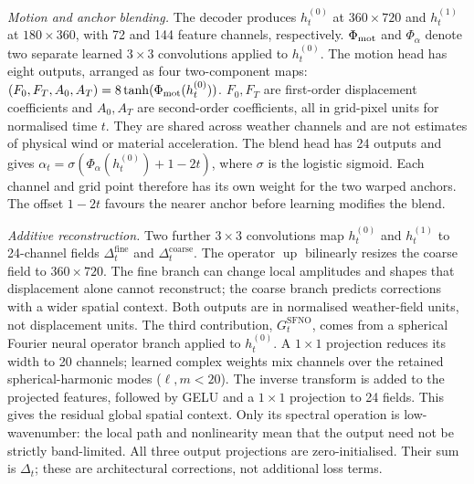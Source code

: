 \documentclass[referee,lineno,pdflatex,sn-nature]{sn-jnl}
\begin{document}
\begin{deferredmethodsintro}
\emph{Motion and anchor blending.}
The decoder produces $h_t^{(0)}$ at $360\times720$ and $h_t^{(1)}$ at
$180\times360$, with 72 and 144 feature channels, respectively.
$\Phi_{\rm mot}$ and $\Phi_\alpha$ denote two separate learned
$3\times3$ convolutions applied to $h_t^{(0)}$.
The motion head has eight outputs, arranged as four two-component maps:
$(F_0,F_T,A_0,A_T)=8\tanh(\Phi_{\rm mot}(h_t^{(0)}))$.
$F_0,F_T$ are first-order displacement coefficients and $A_0,A_T$
are second-order coefficients, all in grid-pixel units for normalised
time $t$. They are shared across weather channels and are not estimates
of physical wind or material acceleration.
The blend head has 24 outputs and gives
$\alpha_t=\sigma(\Phi_\alpha(h_t^{(0)})+1-2t)$, where $\sigma$ is the
logistic sigmoid. Each channel and grid point therefore has its own weight
for the two warped anchors. The offset $1-2t$ favours the nearer anchor
before learning modifies the blend.

\emph{Additive reconstruction.}
Two further $3\times3$ convolutions map $h_t^{(0)}$ and $h_t^{(1)}$ to
24-channel fields $\Delta_t^{\mathrm{fine}}$ and
$\Delta_t^{\mathrm{coarse}}$. The operator $\operatorname{up}$ bilinearly
resizes the coarse field to $360\times720$. The fine branch can change
local amplitudes and shapes that displacement alone cannot reconstruct;
the coarse branch predicts corrections with a wider spatial context.
Both outputs are in normalised weather-field units, not displacement units.
The third contribution, $G_t^{\mathrm{SFNO}}$, comes from a spherical
Fourier neural operator branch \cite{bonev2023sfno} applied to $h_t^{(0)}$.
A $1\times1$ projection reduces its width to 20 channels; learned complex
weights mix channels over the retained spherical-harmonic modes
($\ell,m<20$). The inverse transform is added to the projected features,
followed by GELU and a $1\times1$ projection to 24 fields. This gives
the residual global spatial context. Only its spectral operation is
low-wavenumber: the local path and nonlinearity mean that the output
need not be strictly band-limited. All three output projections are
zero-initialised. Their sum is $\Delta_t$; these are architectural
corrections, not additional loss terms.


\end{deferredmethodsintro}
\end{document}

